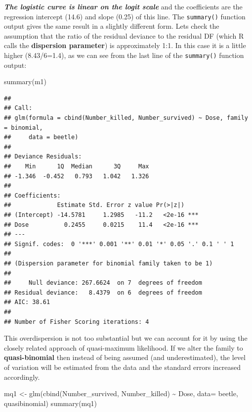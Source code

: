 \documentclass[
]{article}
\newenvironment{Shaded}{\begin{snugshade}}{\end{snugshade}}
\newcommand{\AttributeTok}[1]{\textcolor[rgb]{0.77,0.63,0.00}{#1}}
\newcommand{\FunctionTok}[1]{\textcolor[rgb]{0.00,0.00,0.00}{#1}}
\newcommand{\NormalTok}[1]{#1}
\newcommand{\OtherTok}[1]{\textcolor[rgb]{0.56,0.35,0.01}{#1}}
\newcommand{\SpecialCharTok}[1]{\textcolor[rgb]{0.00,0.00,0.00}{#1}}
\begin{document}
\textbf{\emph{The logistic curve is linear on the logit scale}} and the
coefficients are the regression intercept (14.6) and slope (0.25) of
this line. The \texttt{summary()} function output gives the same result
in a slightly different form. Lets check the assumption that the ratio
of the residual deviance to the residual DF (which R calls the
\textbf{dispersion parameter}) is approximately 1:1. In this case it is
a little higher (8.43/6=1.4), as we can see from the last line of the
\texttt{summary()} function output:

\begin{Shaded}
\begin{Highlighting}[]
\FunctionTok{summary}\NormalTok{(m1)}
\end{Highlighting}
\end{Shaded}

\begin{verbatim}
## 
## Call:
## glm(formula = cbind(Number_killed, Number_survived) ~ Dose, family = binomial, 
##     data = beetle)
## 
## Deviance Residuals: 
##    Min      1Q  Median      3Q     Max  
## -1.346  -0.452   0.793   1.042   1.326  
## 
## Coefficients:
##             Estimate Std. Error z value Pr(>|z|)    
## (Intercept) -14.5781     1.2985   -11.2   <2e-16 ***
## Dose          0.2455     0.0215    11.4   <2e-16 ***
## ---
## Signif. codes:  0 '***' 0.001 '**' 0.01 '*' 0.05 '.' 0.1 ' ' 1
## 
## (Dispersion parameter for binomial family taken to be 1)
## 
##     Null deviance: 267.6624  on 7  degrees of freedom
## Residual deviance:   8.4379  on 6  degrees of freedom
## AIC: 38.61
## 
## Number of Fisher Scoring iterations: 4
\end{verbatim}

This overdispersion is not too substantial but we can account for it by
using the closely related approach of quasi-maximum likelihood. If we
alter the family to \textbf{quasi-binomial} then instead of being
assumed (and underestimated), the level of variation will be estimated
from the data and the standard errors increased accordingly.

\begin{Shaded}
\begin{Highlighting}[]
\NormalTok{mq1 }\OtherTok{\textless{}{-}} \FunctionTok{glm}\NormalTok{(}\FunctionTok{cbind}\NormalTok{(Number\_survived, Number\_killed) }\SpecialCharTok{\textasciitilde{}}\NormalTok{ Dose, }\AttributeTok{data=}\NormalTok{ beetle, quasibinomial)}
\FunctionTok{summary}\NormalTok{(mq1)}
\end{Highlighting}
\end{Shaded}
\end{document}
